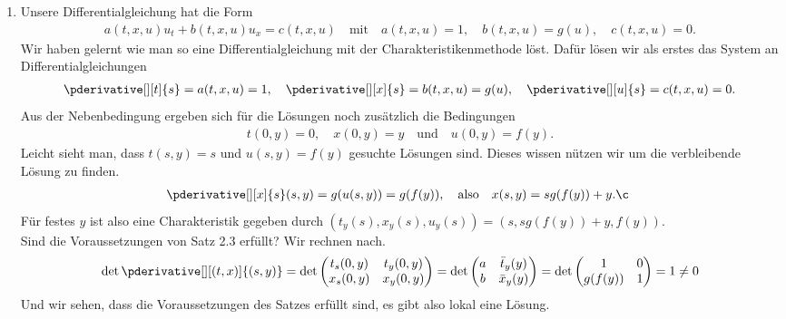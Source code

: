 \begin{solution}

\begin{enumerate}[label = (\roman*)]
	\item Unsere Differentialgleichung hat die Form 
	\begin{align*}
	a(t, x, u) u_t + b(t, x, u)u_x = c(t, x, u) \quad \text{mit} \quad a(t,x,u) = 1, \quad b(t,x,u) = g(u), \quad c(t,x,u) = 0.
	\end{align*}
	Wir haben gelernt wie man so eine Differentialgleichung mit der Charakteristikenmethode löst. Dafür lösen wir als erstes das System an Differentialgleichungen 
	\begin{align*}
	\pderivative[][t]{s} = a(t,x,u) = 1, \quad \pderivative[][x]{s} = b(t,x,u) = g(u), \quad \pderivative[][u]{s} = c(t,x,u) = 0.
	\end{align*}
	Aus der Nebenbedingung ergeben sich für die Lösungen noch zusätzlich die Bedingungen 
	\begin{align*}
	t(0,y) = 0, \quad x(0,y) = y \quad \text{und} \quad u(0,y) = f(y).
	\end{align*}
	Leicht sieht man, dass $t(s,y) = s$ und $u(s,y) = f(y)$ gesuchte Lösungen sind. Dieses wissen nützen wir um die verbleibende Lösung zu finden.
	\begin{align*}
	\pderivative[][x]{s}(s,y) = g(u(s,y)) = g(f(y)), \quad \text{also} \quad x(s,y) = sg(f(y)) + y.¸
	\end{align*}
	Für festes $y$ ist also eine Charakteristik gegeben durch $(t_y(s), x_y(s), u_y(s)) = (s, sg(f(y)) + y, f(y))$. \\
	Sind die Voraussetzungen von Satz 2.3 erfüllt? Wir rechnen nach.
	\begin{align*}
	\det \pderivative[][(t,x)]{(s,y)} = \det
	\begin{pmatrix}
	t_s(0,y) & t_y(0,y) \\
	x_s(0,y) & x_y(0,y)
	\end{pmatrix} 
	= \det
	\begin{pmatrix}
	a & \bar{t}_y(y) \\
	b & \bar{x}_y(y)
	\end{pmatrix} 
	= \det
	\begin{pmatrix}
	1 & 0 \\
	g(f(y)) & 1
	\end{pmatrix} 
	= 1 \neq 0
	\end{align*}
	Und wir sehen, dass die Voraussetzungen des Satzes erfüllt sind, es gibt also lokal eine Lösung.
	

\end{enumerate}
\end{solution}
